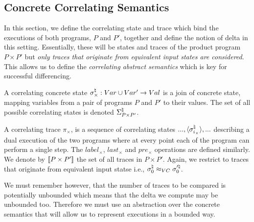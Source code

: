 \subsection{Concrete Correlating Semantics} 

In this section, we define the correlating state and trace which bind the executions of both programs, $P$ and $P'$, together and define the notion of delta in this setting. Essentially, these will be states and traces of the product program $P \times P'$ but \emph{only traces that originate from equivalent input states are considered}. This allows us to define the \emph{correlating abstract semantics} which is key for successful differencing.

\begin{definition}
A correlating concrete state $\sigma^\natural_{\times} : Var \cup Var' \rightarrow Val$ is a join of concrete state, mapping variables from a pair of programs $P$ and $P'$ to their values. The set of all possible correlating states is denoted $\Sigma^\natural_{P \times P'}$.
\end{definition}

\begin{definition}
A correlating trace $\pi_{\times}$, is a sequence of correlating states $...,\langle \sigma^\natural_{i_{\times}} \rangle,...$ describing a dual execution of the two programs where at every point each of the program can perform a single step. The $label_{\times}$, $last_{\times}$ and $pre_{\times}$ operations are defined similarly. We denote by $\lbrack\!\lbrack P \times P' \rbrack\!\rbrack$ the set of all traces in $P \times P'$. Again, we restrict to traces that originate from equivalent input statse i.e., $\sigma^\natural_0 \approx_{VC} \sigma'^\natural_0$.
\end{definition}

We must remember however, that the number of traces to be compared is potentially unbounded which means that the delta we compute may be unbounded too. Therefore we must use an abstraction over the concrete semantics that will allow us to represent executions in a bounded way.

